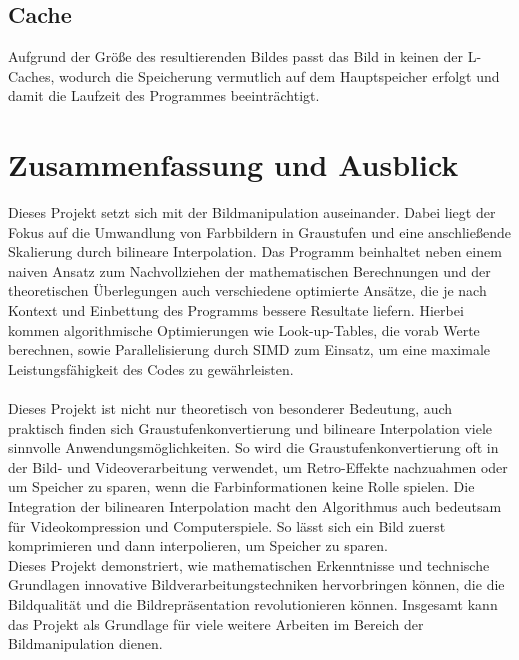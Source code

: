 \documentclass[course=erap]{aspdoc}
\begin{document}
\subsection{Cache}
Aufgrund der Größe des resultierenden Bildes passt das Bild in keinen der L-Caches, wodurch die Speicherung vermutlich auf dem Hauptspeicher erfolgt und damit die Laufzeit des Programmes beeinträchtigt.

\section{Zusammenfassung und Ausblick}
Dieses Projekt setzt sich mit der Bildmanipulation auseinander. Dabei liegt der Fokus auf die Umwandlung von Farbbildern in Graustufen und eine anschließende Skalierung durch bilineare Interpolation. Das Programm beinhaltet neben einem naiven Ansatz zum Nachvollziehen der mathematischen Berechnungen und der theoretischen Überlegungen auch verschiedene optimierte Ansätze, die je nach Kontext und Einbettung des Programms bessere Resultate liefern. Hierbei kommen algorithmische Optimierungen wie Look-up-Tables, die vorab Werte berechnen, sowie Parallelisierung durch SIMD zum Einsatz, um eine maximale Leistungsfähigkeit des Codes zu gewährleisten.\\\\
Dieses Projekt ist nicht nur theoretisch von besonderer Bedeutung, auch praktisch finden sich Graustufenkonvertierung und bilineare Interpolation viele sinnvolle Anwendungsmöglichkeiten. So wird die Graustufenkonvertierung oft in der Bild- und Videoverarbeitung verwendet, um Retro-Effekte nachzuahmen oder um Speicher zu sparen, wenn die Farbinformationen keine Rolle spielen. Die Integration der bilinearen Interpolation macht den Algorithmus auch bedeutsam für Videokompression und Computerspiele. So lässt sich ein Bild zuerst komprimieren und dann interpolieren, um Speicher zu sparen.\\
Dieses Projekt demonstriert, wie mathematischen Erkenntnisse und technische Grundlagen innovative Bildverarbeitungstechniken hervorbringen können, die die Bildqualität und die Bildrepräsentation revolutionieren können. Insgesamt kann das Projekt als Grundlage für viele weitere Arbeiten im Bereich der Bildmanipulation dienen.


{

\cite{ece472}
\cite{ppm}
\cite{ppmformats}
\cite{pgmpgmpbm}
\cite{grafikgraustufen}
\cite{bilint}
\cite{wahrnehmung}

}
\end{document}
